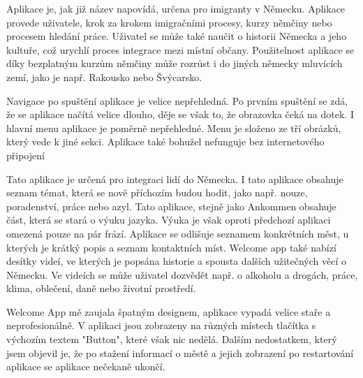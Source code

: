 Aplikace je, jak již název napovídá, určena pro imigranty v Německu. Aplikace provede uživatele, krok za krokem imigračními procesy, kurzy němčiny nebo procesem hledání práce. Uživatel se může také naučit o historii Německa a jeho kultuře, což urychlí proces integrace mezi místní občany. Použitelnost aplikace se díky bezplatným kurzům němčiny může rozrůst i do jiných německy mluvících zemí, jako je např. Rakousko nebo Švýcarsko.
\par
Navigace po spuštění aplikace je velice nepřehledná. Po prvním spuštění se zdá, že se aplikace načítá velice dlouho, děje se však to, že obrazovka čeká na dotek. I hlavní menu aplikace je poměrně nepřehledné. Menu je složeno ze tří obrázků, který vede k jiné sekci. Aplikace také bohužel nefunguje bez internetového připojení


Tato aplikace je určená pro integraci lidí do Německa. I tato aplikace obsahuje seznam témat, která se nově příchozím budou hodit, jako např. nouze, poradenství, práce nebo azyl. Tato aplikace, stejně jako Ankommen obsahuje část, která se stará o výuku jazyka. Výuka je však oproti předchozí aplikaci omezená pouze na pár frází. Aplikace se odlišuje seznamem konkrétních měst, u kterých je krátký popis a seznam kontaktních míst. Welcome app také nabízí desítky videí, ve kterých je popsána historie a spousta dalších užitečných věcí o Německu. Ve videích se může uživatel dozvědět např. o alkoholu a drogách, práce, klima, oblečení, daně nebo životní prostředí.
\par
Welcome App mě zaujala špatným designem, aplikace vypadá velice staře a neprofesionálně. V aplikaci jsou zobrazeny na různých místech tlačítka s výchozím textem "Button", které však nic nedělá. Dalším nedostatkem, který jsem objevil je, že po stažení informací o městě a jejich zobrazení po restartování aplikace se aplikace nečekaně ukončí.









